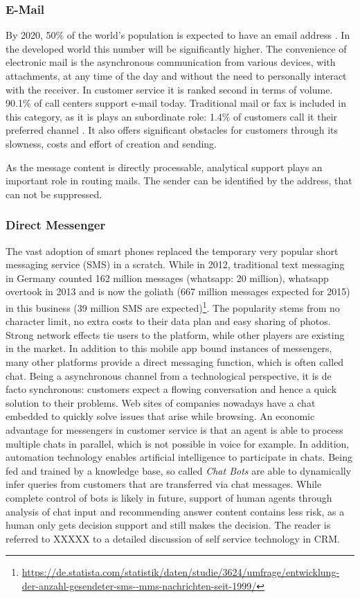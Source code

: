 		\subsubsection{E-Mail}
		
		By 2020, 50\% of the world's population is expected to have an email address \cite{radial2016}. In the developed world this number will be significantly higher. The convenience of electronic mail is the asynchronous communication from various devices, with attachments, at any time of the day and without the need to personally interact with the receiver. In customer service it is ranked second in terms of volume. 90.1\% of call centers support e-mail \cite{dimensiondata2016} today. Traditional mail or fax is included in this category, as it is plays an subordinate role: 1.4\% of customers call it their preferred channel \cite{ocm2015}. It also offers significant obstacles for customers through its slowness, costs and effort of creation and sending. 
		
		As the message content is directly processable, analytical support plays an important role in routing mails. The sender can be identified by the address, that can not be suppressed. 
		
		\subsubsection{Direct Messenger}
		The vast adoption of smart phones replaced the temporary very popular short messaging service (SMS) in a scratch.  While in 2012, traditional text messaging in Germany counted 162 million messages (whatsapp: 20 million), whatsapp overtook in 2013 and is now the goliath (667 million messages expected for 2015) in this business (39 million SMS are expected)\footnote{\cf \url{https://de.statista.com/statistik/daten/studie/3624/umfrage/entwicklung-der-anzahl-gesendeter-sms--mms-nachrichten-seit-1999/}}. The popularity stems from no character limit, no extra costs to their data plan and easy sharing of photos. Strong network effects tie users to the platform, while other players are existing in the market. In addition to this mobile app bound instances of messengers, many other platforms provide a direct messaging function, which is often called chat. Being a asynchronous channel from a technological perspective, it is de facto synchronous: customers expect a flowing conversation and hence a quick solution to their problems. Web sites of companies nowadays have a chat embedded to quickly solve issues that arise while browsing. An economic advantage for messengers in customer service is that an agent is able to process multiple chats in parallel, which is not possible in voice for example. In addition, automation technology enables artificial intelligence to participate in chats. Being fed and trained by a knowledge base, so called \textit{Chat Bots} are able to dynamically infer queries from customers that are transferred via chat messages. While complete control of bots is likely in future, support of human agents through analysis of chat input and recommending answer content contains less risk, as a human only gets decision support and still makes the decision. The reader is referred to XXXXX to a detailed discussion of self service technology in \acrshort{CRM}. 
		
